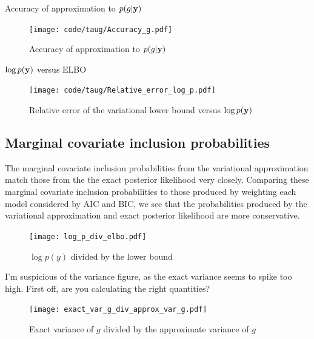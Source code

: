 \documentclass{amsart}[12pt]
\newcommand{\mgc}[1]{{\color{blue}#1}}
\begin{document}
Accuracy of approximation to $p(g | {\bf y})$ \\

\begin{figure}[p]
	\caption{Accuracy of approximation to $p(g | {\bf y})$}
	\label{fig:accuracy_g}
	\texttt{[image: code/taug/Accuracy\_g.pdf]}
\end{figure}


$\log{p({\bf y})}$ versus ELBO \\

\begin{figure}[p]
	\caption{Relative error of the variational lower bound versus $\log{p({\bf y})}$}
	\label{fig:relative_error}
	\texttt{[image: code/taug/Relative\_error\_log\_p.pdf]}
\end{figure}

\subsection{Marginal covariate inclusion probabilities}

The marginal covariate inclusion probabilities from the variational approximation match those from the the
exact posterior likelihood very closely. Comparing these marginal covariate inclusion probabilities to those
produced by weighting each model considered by AIC and BIC, we see that the probabilities produced by the
variational approximation and exact posterior likelihood are more conservative.

\begin{figure}[p]
	\caption{$\log p(y)$ divided by the lower bound}
	\label{fig:log_p_div_elbo}
	\texttt{[image: log\_p\_div\_elbo.pdf]}
\end{figure}

\mgc{I'm suspicious of the variance figure, as the exact variance seems to spike too high. First off, are
		 you calculating the right quantities?}

\begin{figure}[p]
	\caption{Exact variance of $g$ divided by the approximate variance of $g$}
	\label{fig:exact_var_g_div_approx_var_g}
	\texttt{[image: exact\_var\_g\_div\_approx\_var\_g.pdf]}
\end{figure}


\end{document}
